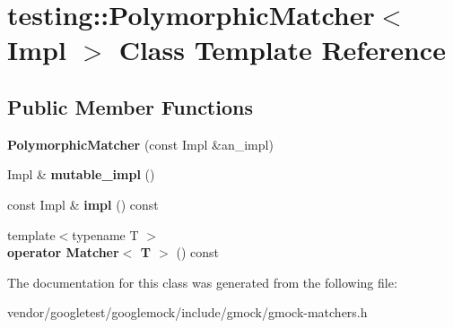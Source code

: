 \hypertarget{classtesting_1_1_polymorphic_matcher}{}\section{testing\+:\+:Polymorphic\+Matcher$<$ Impl $>$ Class Template Reference}
\label{classtesting_1_1_polymorphic_matcher}
\subsection*{Public Member Functions}
\begin{DoxyCompactItemize}
\item 
\mbox{\label{classtesting_1_1_polymorphic_matcher_a04c23972b2dcc6e036b00006d7689712}} 
{\bfseries Polymorphic\+Matcher} (const Impl \&an\+\_\+impl)
\item 
\mbox{\label{classtesting_1_1_polymorphic_matcher_a3b7227b1f5c203efd47d393b781b317c}} 
Impl \& {\bfseries mutable\+\_\+impl} ()
\item 
\mbox{\label{classtesting_1_1_polymorphic_matcher_ab10e4858d8dc903d3e1e378d53d25882}} 
const Impl \& {\bfseries impl} () const
\item 
\mbox{\label{classtesting_1_1_polymorphic_matcher_a6280c1485ca41a48c858c38828c1e04e}} 
{\footnotesize template$<$typename T $>$ }\\{\bfseries operator Matcher$<$ T $>$} () const
\end{DoxyCompactItemize}


The documentation for this class was generated from the following file\+:\begin{DoxyCompactItemize}
\item 
vendor/googletest/googlemock/include/gmock/gmock-\/matchers.\+h\end{DoxyCompactItemize}
